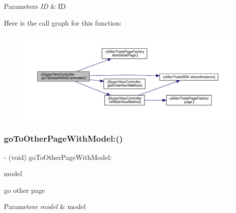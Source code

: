\begin{DoxyParams}{Parameters}
{\em ID} & ID \\
\hline
\end{DoxyParams}
Here is the call graph for this function\+:\nopagebreak
\begin{figure}[H]
\begin{center}
\leavevmode
\includegraphics[width=350pt]{interface_super_view_controller_a5b008f8c6991f8323ebedfb05960940f_cgraph}
\end{center}
\end{figure}
\mbox{\label{interface_super_view_controller_a3ad11692826d442ca019a3d84cac3366}} 
\subsubsection{\texorpdfstring{go\+To\+Other\+Page\+With\+Model\+:()}{goToOtherPageWithModel:()}}
{\footnotesize\ttfamily -\/ (void) go\+To\+Other\+Page\+With\+Model\+: \begin{DoxyParamCaption}\item[{(id)}]{model }\end{DoxyParamCaption}}

go other page


\begin{DoxyParams}{Parameters}
{\em model} & model \\
\hline
\end{DoxyParams}
\mbox{\label{interface_super_view_controller_a8160c01dd45f478af7622edc455c5d7e}} 
